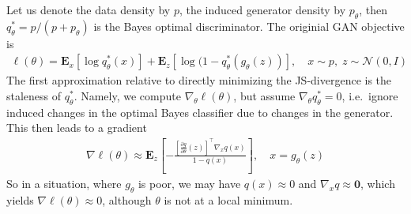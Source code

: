 \documentclass[12pt,a4paper]{article}
\newcommand{\mb}{\mathbf}
\begin{document}
Let us denote the data density by $p$, the induced generator density by $p_\theta$, then $q_\theta^*=p/(p+p_\theta)$ is the Bayes optimal discriminator.  The originial GAN objective is
\begin{align}
\ell(\theta) = \mb E_x[\log q_\theta^*(x)] + \mb E_z[\log(1 - q_\theta^*(g_\theta(z))], \quad x\sim p, \; z \sim \mathcal N(0,I)
\end{align}
The first approximation relative to directly minimizing the JS-divergence is the staleness of $q^*_\theta$. Namely, we compute $\nabla_\theta \ell(\theta)$, but assume $\nabla_\theta q_\theta^* =0$, i.e.~ignore induced changes in the optimal Bayes classifier due to changes in the generator. This then leads to a gradient 
\begin{align}
\nabla \ell(\theta) \approx \mb E_z\left[ - 
	\frac{\left[ \frac{\partial g}{\partial \theta}(z) \right]^\top \nabla_x q(x)  }{1-q(x)} 
\right], \quad x= g_\theta(z)
\end{align}
So in a situation, where $g_\theta$ is poor, we may have $q(x)\approx 0$ and $\nabla_x q\approx \mb 0$, which yields $\nabla \ell(\theta) \approx 0$, although $\theta$ is not at a local minimum.\\






\end{document}
